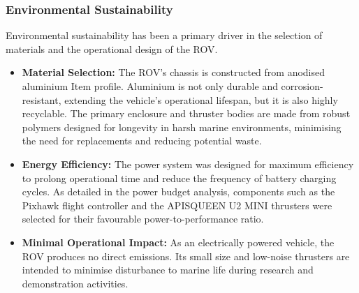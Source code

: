 \documentclass[11pt, a4paper]{article}
\begin{document}
\subsubsection{Environmental Sustainability}
Environmental sustainability has been a primary driver in the selection of materials and the operational design of the ROV.
\begin{itemize}
    \item \textbf{Material Selection:} The ROV's chassis is constructed from anodised aluminium Item profile. Aluminium is not only durable and corrosion-resistant, extending the vehicle's operational lifespan, but it is also highly recyclable. The primary enclosure and thruster bodies are made from robust polymers designed for longevity in harsh marine environments, minimising the need for replacements and reducing potential waste.
    
    \item \textbf{Energy Efficiency:} The power system was designed for maximum efficiency to prolong operational time and reduce the frequency of battery charging cycles. As detailed in the power budget analysis, components such as the Pixhawk flight controller and the APISQUEEN U2 MINI thrusters were selected for their favourable power-to-performance ratio. 
    
    \item \textbf{Minimal Operational Impact:} As an electrically powered vehicle, the ROV produces no direct emissions. Its small size and low-noise thrusters are intended to minimise disturbance to marine life during research and demonstration activities.
\end{itemize}
\end{document}

